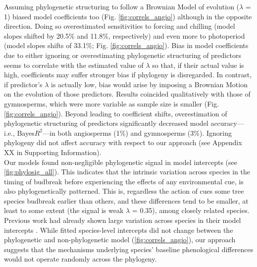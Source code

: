 \documentclass{article}\usepackage[]{graphicx}\usepackage[]{color}
\begin{document}
Assuming phylogenetic structuring to follow a Brownian Model of evolution ($\lambda$ = 1) biased model coefficients too (Fig. \ref{fig:correls_angio}) although in the opposite direction. Doing so overestimated sensitivities to forcing and chilling (model slopes shifted by 20.5\% and 11.8\%, respectively) and even more to photoperiod (model slopes shifts of 33.1\%; Fig. \ref{fig:correls_angio}). Bias in model coefficients due to either ignoring or overestimating phylogenetic structuring of predictors seems to correlate with the estimated value of $\lambda$ so that, if their actual value is high, coefficients may suffer stronger bias if phylogeny is disregarded. In contrast, if predictor's $\lambda$ is actually low, bias would arise by imposing a Brownian Motion on the evolution of those predictors. Results coincided qualitatively with those of gymnosperms, which were more variable as sample size is smaller (Fig. \ref{fig:correls_angio}). Beyond leading to coefficient shifts, overestimation of phylogenetic structuring of predictors significantly decreased model accuracy---i.e., Bayes$R^{2}$---in both angiosperms (1\%) and gymnosperms (3\%). Ignoring phylogeny did not affect accuracy with respect to our approach (see Appendix XX in Supporting Information).\\ 

Our models found non-negligible phylogenetic signal in model intercepts (see \ref{fig:phylosig_all}). This indicates that the intrinsic variation across species in the timing of budbreak before experiencing the effects of any environmental cue, is also phylogenetically patterned. This is, regardless the action of cues some tree species budbreak earlier than others, and these differences tend to be smaller, at least to some extent (the signal is weak $\lambda$ = 0.35), among closely related species. Previous work had already shown large variation across species in their model intercepts \citep{davies2013phylogenetic}. %
While fitted species-level intercepts did not change between the phylogenetic and non-phylogenetic model (\ref{fig:correls_angio}), our approach suggests that the mechanisms underlying species' baseline phenological differences would not operate randomly across the phylogeny.\\    
\end{document}
